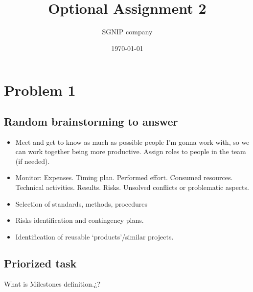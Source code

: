 \documentclass{article}
\title{Optional Assignment 2}
\date{\today}
\author{SGNIP company}
\begin{document}
\maketitle

\newpage

\section{Problem 1}

\subsection{Random brainstorming to answer}

\begin{itemize}
	\item Meet and get to know as much as possible people I'm gonna work with, so we can work together being more productive.
	\subitem Assign roles to people in the team (if needed).
	\item Monitor:
	\subitem	Expenses.
	\subitem Timing plan.
	\subitem Performed effort.
	\subitem Consumed resources.
	\subitem Technical	activities.
	\subitem Results.
	\subitem Risks.
	\subitem Unsolved conflicts or problematic aspects.
	\item Selection of standards, methods, procedures
	\item Risks identification and contingency plans.
	\item Identification of reusable ‘products’/similar projects.
	
\end{itemize}

\subsection{Priorized task}
What is Milestones definition.¿?
\end{document}
